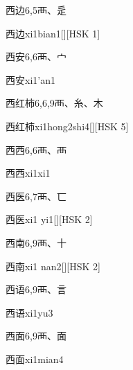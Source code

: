 \begin{entry}{西边}{6,5}{⾑、⾡}
  \begin{phonetics}{西边}{xi1bian1}[][HSK 1]
  \end{phonetics}
\end{entry}

\begin{entry}{西安}{6,6}{⾑、⼧}
  \begin{phonetics}{西安}{xi1'an1}
  \end{phonetics}
\end{entry}

\begin{entry}{西红柿}{6,6,9}{⾑、⽷、⽊}
  \begin{phonetics}{西红柿}{xi1hong2shi4}[][HSK 5]
  \end{phonetics}
\end{entry}

\begin{entry}{西西}{6,6}{⾑、⾑}
  \begin{phonetics}{西西}{xi1xi1}
  \end{phonetics}
\end{entry}

\begin{entry}{西医}{6,7}{⾑、⼖}
  \begin{phonetics}{西医}{xi1 yi1}[][HSK 2]
  \end{phonetics}
\end{entry}

\begin{entry}{西南}{6,9}{⾑、⼗}
  \begin{phonetics}{西南}{xi1 nan2}[][HSK 2]
  \end{phonetics}
\end{entry}

\begin{entry}{西语}{6,9}{⾑、⾔}
  \begin{phonetics}{西语}{xi1yu3}
  \end{phonetics}
\end{entry}

\begin{entry}{西面}{6,9}{⾑、⾯}
  \begin{phonetics}{西面}{xi1mian4}
  \end{phonetics}
\end{entry}

